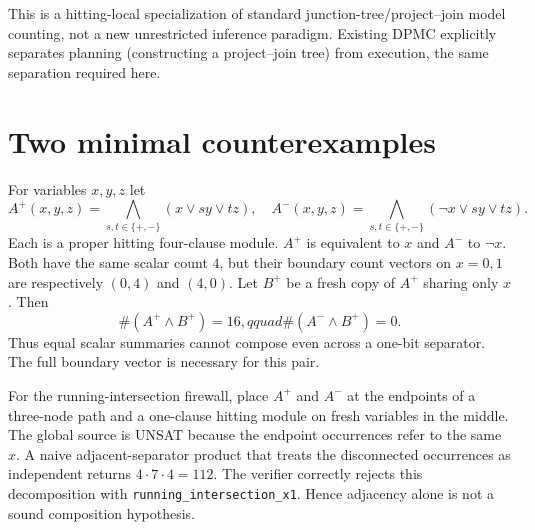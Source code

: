 \documentclass[11pt]{article}
\begin{document}
This is a hitting-local specialization of standard junction-tree/project--join
model counting, not a new unrestricted inference paradigm.  Existing DPMC
explicitly separates planning (constructing a project--join tree) from execution,
the same separation required here.

\section{Two minimal counterexamples}
For variables $x,y,z$ let
\[
A^+(x,y,z)=\bigwedge_{s,t\in\{+,-\}}(x\vee s y\vee t z),
\quad
A^-(x,y,z)=\bigwedge_{s,t\in\{+,-\}}(\neg x\vee s y\vee t z).
\]
Each is a proper hitting four-clause module.  $A^+$ is equivalent to $x$ and
$A^-$ to $\neg x$.  Both have the same scalar count $4$, but their boundary count
vectors on $x=0,1$ are respectively $(0,4)$ and $(4,0)$.  Let $B^+$ be a fresh
copy of $A^+$ sharing only $x$.  Then
\[
\#(A^+\wedge B^+)=16,qquad \#(A^-\wedge B^+)=0.
\]
Thus equal scalar summaries cannot compose even across a one-bit separator.  The
full boundary vector is necessary for this pair.

For the running-intersection firewall, place $A^+$ and $A^-$ at the endpoints of
a three-node path and a one-clause hitting module on fresh variables in the middle.
The global source is UNSAT because the endpoint occurrences refer to the same
$x$.  A naive adjacent-separator product that treats the disconnected occurrences
as independent returns $4\cdot7\cdot4=112$.  The verifier correctly rejects this
decomposition with \texttt{running\_intersection\_x1}.  Hence adjacency alone is
not a sound composition hypothesis.
\end{document}
